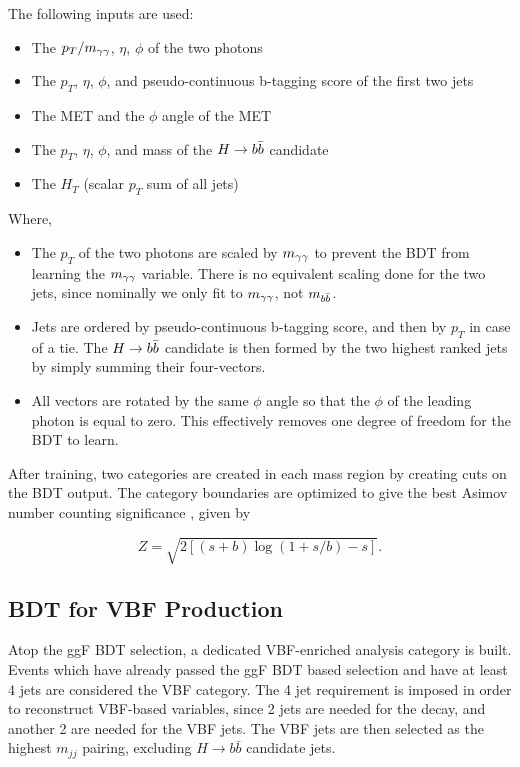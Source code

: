 The following inputs are used:

\begin{itemize}
	\item{The $p_{T}/m_{\gamma\gamma}$, $\eta$, $\phi$ of the two photons} 
	\item{The $p_{T}$, $\eta$, $\phi$, and pseudo-continuous b-tagging score of the first two jets}
	\item{The MET and the $\phi$ angle of the MET}
	\item{The $p_{T}$, $\eta$, $\phi$, and mass of the $H\rightarrow b\bar{b}$ candidate}
	\item{The $H_{T}$ (scalar $p_{T}$ sum of all jets)}
\end{itemize}

Where,

\begin{itemize}
	\item{The $p_{T}$ of the two photons are scaled by $m_{\gamma\gamma}$ to prevent the BDT from learning the $m_{\gamma\gamma}$ variable. There is no equivalent scaling done for the two jets, since nominally we only fit to $m_{\gamma\gamma}$, not $m_{b\bar{b}}$.}
	\item{Jets are ordered by pseudo-continuous b-tagging score, and then by $p_{T}$ in case of a tie. The $H \rightarrow b\bar{b}$ candidate is then formed by the two highest ranked jets by simply summing their four-vectors.}
	\item{All vectors are rotated by the same $\phi$ angle so that the $\phi$ of the leading photon is equal to zero. This effectively removes one degree of freedom for the BDT to learn.}
\end{itemize}

After training, two categories are created in each mass region by creating cuts on the BDT output. The category boundaries are optimized to give the best Asimov number counting significance \cite{asimov}, given by

\begin{equation}\label{eqn:asimov-significance}
    Z = \sqrt{2[(s+b)\log{(1 + s/b)} -s]}.
\end{equation}


\subsection{BDT for VBF Production}
Atop the ggF \gls{BDT} selection, a dedicated VBF-enriched analysis category is built. Events which have already passed the ggF BDT based selection and have at least 4 jets are considered the VBF category. The 4 jet requirement is imposed in order to reconstruct VBF-based variables, since 2 jets are needed for the \Hbb decay, and another 2 are needed for the VBF jets. The VBF jets are then selected as the highest $m_{jj}$ pairing, excluding $H\rightarrow b\bar{b}$ candidate jets.

